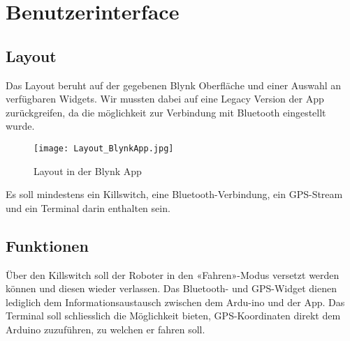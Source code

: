 \section{Benutzerinterface}

\subsection{Layout}
Das Layout beruht auf der gegebenen Blynk Oberfläche und einer Auswahl an verfügbaren Widgets. Wir mussten dabei auf eine Legacy Version der App zurückgreifen, da die möglichkeit zur Verbindung mit Bluetooth eingestellt wurde.

\begin{figure}[H]
    \begin{center}
    \texttt{[image: Layout\_BlynkApp.jpg]}
    \end{center}
    \caption{Layout in der Blynk App}
\end{figure}

Es soll mindestens ein Killswitch, eine Bluetooth-Verbindung, ein GPS-Stream und ein Terminal darin enthalten sein.

\subsection{Funktionen}
Über den Killswitch soll der Roboter in den «Fahren»-Modus versetzt werden können und diesen wieder verlassen. Das Bluetooth- und GPS-Widget dienen lediglich dem Informationsaustausch zwischen dem Ardu-ino und der App. Das Terminal soll schliesslich die Möglichkeit bieten, GPS-Koordinaten direkt dem Arduino zuzuführen, zu welchen er fahren soll.